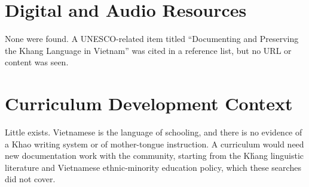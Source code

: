 \documentclass[12pt]{article}
\begin{document}
\section{Digital and Audio Resources}
None were found. A UNESCO-related item titled ``Documenting and Preserving the Khang Language in Vietnam'' was cited in a reference list, but no URL or content was seen.

\section{Curriculum Development Context}
Little exists. Vietnamese is the language of schooling, and there is no evidence of a Khao writing system or of mother-tongue instruction. A curriculum would need new documentation work with the community, starting from the K\'hang linguistic literature and Vietnamese ethnic-minority education policy, which these searches did not cover.
\end{document}
